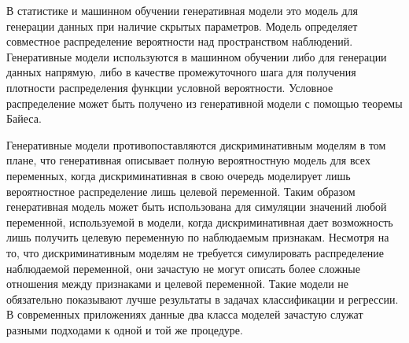\documentclass[../diploma.tex]{subfiles}
\begin{document}
В статистике и машинном обучении генеративная модели это модель для генерации данных при наличие скрытых параметров. Модель определяет совместное распределение вероятности над пространством наблюдений. Генеративные модели используются в машинном обучении либо для генерации данных напрямую, либо в качестве промежуточного шага для получения плотности распределения функции условной вероятности. Условное распределение может быть получено из генеративной модели с помощью теоремы Байеса.

Генеративные модели противопоставляются дискриминативным моделям в том плане, что генеративная описывает полную вероятностную модель для всех переменных, когда дискриминативная в свою очередь моделирует лишь вероятностное распределение лишь целевой переменной. Таким образом генеративная модель может быть использована для симуляции значений любой переменной, используемой в модели, когда дискриминативная дает возможность лишь получить целевую переменную по наблюдаемым признакам. Несмотря на то, что дискриминативным моделям не требуется симулировать распределение наблюдаемой переменной, они зачастую не могут описать более сложные отношения между признаками и целевой переменной. Такие модели не обязательно показывают лучше результаты в задачах классификации и регрессии. В современных приложениях данные два класса моделей зачастую служат разными подходами к одной и той же процедуре.
\cite{wiki:generative}
\end{document}
